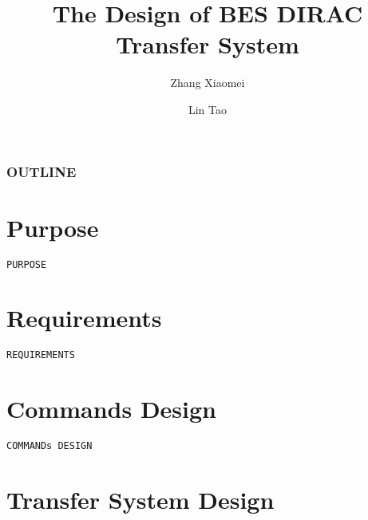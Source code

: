 \documentclass[20pt]{beamer}
\begin{document}
\title{The Design of BES DIRAC Transfer System}
\author{
    Zhang Xiaomei 
    \and
    Lin Tao 
}


\maketitle

\begin{frame}
    \frametitle{OUTLINE}
    \tableofcontents
\end{frame}


\section{Purpose}

\begin{frame}
    \begin{center}
        \LARGE \tt{PURPOSE}
    \end{center}
\end{frame}

\section{Requirements}

\begin{frame}
    \begin{center}
        \LARGE \tt{REQUIREMENTS}
    \end{center}
\end{frame}

\section{Commands Design}

\begin{frame}
    \begin{center}
        \LARGE \tt{COMMANDs DESIGN}
    \end{center}
\end{frame}

\section{Transfer System Design}

    
\end{document}

